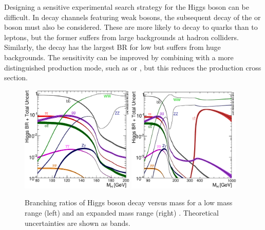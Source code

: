 Designing a sensitive experimental search strategy for the Higgs boson can be difficult. 
In decay channels featuring weak bosons, the subsequent decay of the \PW or \PZ boson must 
also be considered. These are more likely to decay to quarks than to leptons, but the 
former suffers from large backgrounds at hadron colliders. Similarly, the 
\HepProcess{\Pbottom \APbottom} decay has the largest \ac{BR} for low \mH but suffers from 
huge backgrounds. The sensitivity can be improved by combining with a more distinguished 
production mode, such as \WH or \ZH, but this reduces the production cross section.

\begin{figure}
	\includegraphics[width=0.48\textwidth]{tex/motivation/BR_lowrange}
	\hfill
	\includegraphics[width=0.48\textwidth]{tex/motivation/BR_fullrange}
	\caption{Branching ratios of Higgs boson decay versus mass for a low mass range (left) 
	and an expanded mass range (right) \cite{YR3}. Theoretical uncertainties are shown as 
	bands.}
	\label{fig:higgs_br}
\end{figure}

